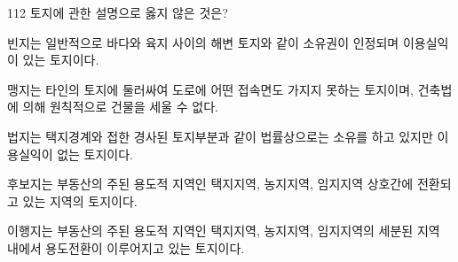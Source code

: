 \begin{question}{112}
토지에 관한 설명으로 옳지 않은 것은?
\begin{choices}
  \item 빈지는 일반적으로 바다와 육지 사이의 해변 토지와 같이 소유권이 인정되며 이용실익이 있는 토지이다.
  \item 맹지는 타인의 토지에 둘러싸여 도로에 어떤 접속면도 가지지 못하는 토지이며, 건축법에 의해 원칙적으로 건물을 세울 수 없다.
  \item 법지는 택지경계와 접한 경사된 토지부분과 같이 법률상으로는 소유를 하고 있지만 이용실익이 없는 토지이다.
  \item 후보지는 부동산의 주된 용도적 지역인 택지지역, 농지지역, 임지지역 상호간에 전환되고 있는 지역의 토지이다.
  \item 이행지는 부동산의 주된 용도적 지역인 택지지역, 농지지역, 임지지역의 세분된 지역 내에서 용도전환이 이루어지고 있는 토지이다.
\end{choices}
\end{question}
